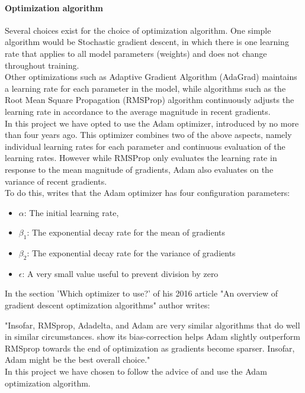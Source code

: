\begin{multicols}{2}
\paragraph{Optimization algorithm}
Several choices exist for the choice of optimization algorithm. One simple algorithm would be Stochastic gradient descent, in which there is one learning rate that applies to all model parameters (weights) and does not change throughout training.\\
Other optimizations such as Adaptive Gradient Algorithm (AdaGrad) maintains a learning rate for each parameter in the model, while algorithms such as the Root Mean Square Propagation (RMSProp) algorithm continuously adjusts the learning rate in accordance to the average magnitude in recent gradients.\\
In this project we have opted to use the Adam optimizer, introduced by \citeauthor{Adam} no more than four years ago. This optimizer combines two of the above aspects, namely individual learning rates for each parameter and continuous evaluation of the learning rates. However while RMSProp only evaluates the learning rate in response to the mean magnitude of gradients, Adam also evaluates on the variance of recent gradients.\\
To do this, \citeauthor{Adam} writes that the Adam optimizer has four configuration parameters: 
\begin{itemize}
\item $\alpha$: The initial learning rate,
\item $\beta_1$: The exponential decay rate for the mean of gradients
\item $\beta_2$: The exponential decay rate for the variance of gradients
\item $\epsilon$: A very small value useful to prevent division by zero
\end{itemize}
In the section 'Which optimizer to use?' of his 2016 article "An overview of gradient descent optimization algorithms" author \citeauthor{Ruder16} writes:

"Insofar, RMSprop, Adadelta, and Adam are very similar algorithms that do well in similar circumstances. \citeauthor{Adam} show its bias-correction helps Adam slightly outperform RMSprop towards the end of optimization as gradients become sparser. Insofar, Adam might be the best overall choice."\\
In this project we have chosen to follow the advice of \citeauthor{Ruder16} and use the Adam optimization algorithm.


\end{multicols}
